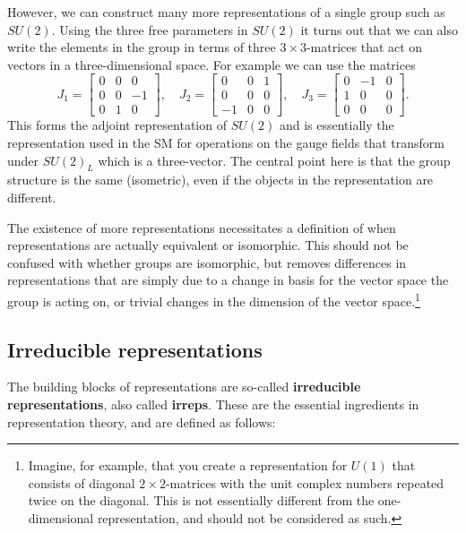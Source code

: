 \documentclass[notes.tex]{subfiles}
\begin{document}
However, we can construct many more representations of a single group such as $SU(2)$. Using the three free parameters in $SU(2)$ it turns out that we can also write the elements in the group in terms of three  $3\times3$-matrices that act on vectors in a three-dimensional space. For example we can use the matrices
\begin{equation}
J_1 =\left[\begin{matrix} 0 & 0 & 0 \\ 0 & 0 & -1 \\ 0 & 1 & 0  \end{matrix}\right], 
\quad J_2 =\left[\begin{matrix} 0 & 0 & 1 \\ 0 & 0 & 0 \\ -1 & 0 & 0  \end{matrix}\right], 
\quad J_3 =\left[\begin{matrix} 0 & -1 & 0 \\ 1 & 0 & 0 \\ 0 & 0 & 0  \end{matrix}\right].
\label{eq:SO3_generators}
\end{equation}
This forms the adjoint representation of $SU(2)$ and is essentially the representation used in the SM for operations on the gauge fields that transform under $SU(2)_L$ which is a three-vector. The central point here is that the group structure is the same (isometric), even if the objects in the representation are different.

The existence of more representations necessitates a definition of when representations are actually equivalent or isomorphic. This should not be confused with whether groups are isomorphic, but removes differences in representations that are simply due to a change in basis for the vector space the group is acting on, or trivial changes in the dimension of the vector space.\footnote{Imagine, for example, that you create a representation for $U(1)$ that consists of diagonal $2\times2$-matrices with the unit complex numbers repeated twice on the diagonal. This is not essentially different from the one-dimensional representation, and should not be considered as such.}


\subsection{Irreducible representations}
\label{sec:irreps}
The building blocks of representations are so-called {\bf irreducible representations}, also called {\bf irreps}. These are the essential ingredients in representation theory, and are defined as follows: 
\end{document}
